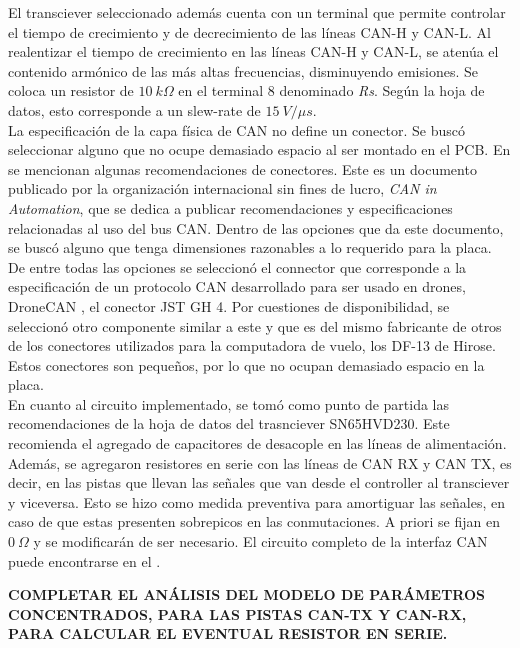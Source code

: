 El transciever seleccionado además cuenta con un terminal que permite controlar el tiempo de crecimiento y de decrecimiento de las líneas CAN-H y CAN-L. Al realentizar el tiempo de crecimiento en las líneas CAN-H y CAN-L, se atenúa el contenido armónico de las más altas frecuencias, disminuyendo emisiones. Se coloca un resistor de $10 \ k\Omega$ en el terminal 8 denominado \textit{Rs}. Según la hoja de datos, esto corresponde a un slew-rate de $15 \ V / \mu s$.\\

La especificación de la capa física de CAN no define un conector. Se buscó seleccionar alguno que no ocupe demasiado espacio al ser montado en el PCB. En \cite{CiAconnector} se mencionan algunas recomendaciones de conectores. Este es un documento publicado por la organización internacional sin fines de lucro, \textit{CAN in Automation}, que se dedica a publicar recomendaciones y especificaciones relacionadas al uso del bus CAN. Dentro de las opciones que da este documento, se buscó alguno que tenga dimensiones razonables a lo requerido para la placa. De entre todas las opciones se seleccionó el connector que corresponde a la especificación de un protocolo CAN desarrollado para ser usado en drones, DroneCAN \cite{DroneCAN}, el conector JST GH 4. Por cuestiones de disponibilidad, se seleccionó otro componente similar a este y que es del mismo fabricante de otros de los conectores utilizados para la computadora de vuelo, los DF-13 de Hirose. Estos conectores son pequeños, por lo que no ocupan demasiado espacio en la placa.\\

En cuanto al circuito implementado, se tomó como punto de partida las recomendaciones de la hoja de datos del trasnciever SN65HVD230. Este recomienda el agregado de capacitores de desacople en las líneas de alimentación. Además, se agregaron resistores en serie con las líneas de CAN RX y CAN TX, es decir, en las pistas que llevan las señales que van desde el controller al transciever y viceversa. Esto se hizo como medida preventiva para amortiguar las señales, en caso de que estas presenten sobrepicos en las conmutaciones. A priori se fijan en $0 \ \Omega$ y se modificarán de ser necesario. El circuito completo de la interfaz CAN puede encontrarse en el .

\textbf{{\color{red} COMPLETAR EL ANÁLISIS DEL MODELO DE PARÁMETROS CONCENTRADOS, PARA LAS PISTAS CAN-TX Y CAN-RX, PARA CALCULAR EL EVENTUAL RESISTOR EN SERIE.}}

